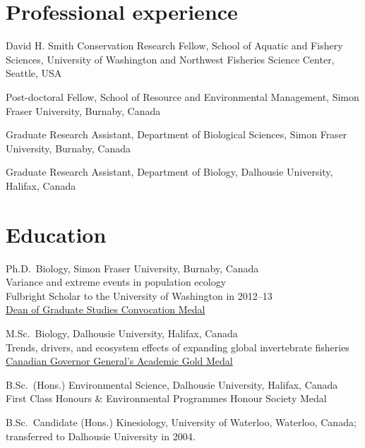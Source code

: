 \section{Professional experience}\label{professional-experience}

\begin{description}
\tightlist
\item[2015--16]
David H. Smith Conservation Research Fellow, School of Aquatic and
Fishery Sciences, University of Washington and Northwest Fisheries
Science Center, Seattle, USA
\item[2015]
Post-doctoral Fellow, School of Resource and Environmental Management,
Simon Fraser University, Burnaby, Canada
\item[2011--15]
Graduate Research Assistant, Department of Biological Sciences, Simon
Fraser University, Burnaby, Canada
\item[2008--11]
Graduate Research Assistant, Department of Biology, Dalhousie
University, Halifax, Canada
\end{description}

\section{Education}\label{education}

\begin{description}
\tightlist
\item[2011--15]
Ph.D.\ Biology, Simon Fraser University, Burnaby, Canada\\
Variance and extreme events in population ecology\\
Fulbright Scholar to the University of Washington in 2012--13\\
\href{https://www.sfu.ca/dean-gradstudies/blog/year/2015/06/SeanAnderson.html}{Dean
of Graduate Studies Convocation Medal}
\item[2008--10]
M.Sc.\ Biology, Dalhousie University, Halifax, Canada\\
Trends, drivers, and ecosystem effects of expanding global invertebrate
fisheries\\
\href{http://goo.gl/nA1zE}{Canadian Governor General's Academic Gold
Medal}
\item[2004--07]
B.Sc.\ (Hons.) Environmental Science, Dalhousie University, Halifax,
Canada\\
First Class Honours \& Environmental Programmes Honour Society Medal
\item[2001--03]
B.Sc.\ Candidate (Hons.) Kinesiology, University of Waterloo, Waterloo,
Canada; transferred to Dalhousie University in 2004.
\end{description}

